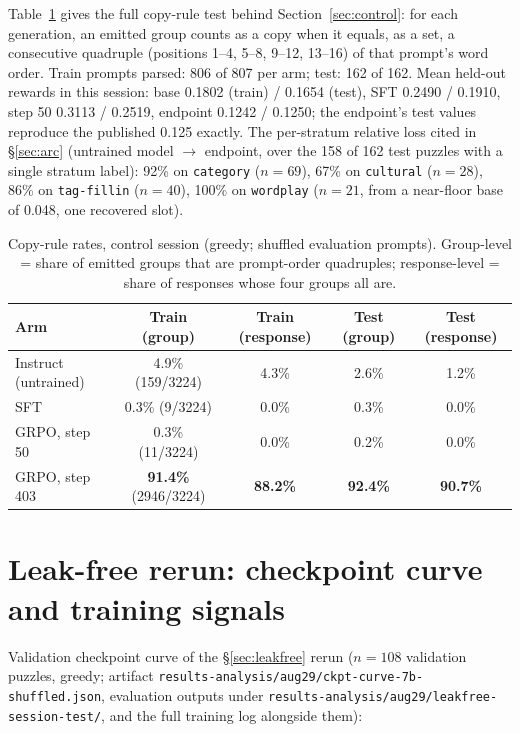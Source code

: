 \documentclass{article}
\begin{document}
Table~\ref{tab:copy} gives the full copy-rule test behind
Section~\ref{sec:control}: for each generation, an emitted group counts as
a copy when it equals, as a set, a consecutive quadruple (positions 1--4,
5--8, 9--12, 13--16) of that prompt's word order. Train prompts parsed:
806 of 807 per arm; test: 162 of 162. Mean held-out rewards in this
session: base 0.1802 (train) / 0.1654 (test), SFT 0.2490 / 0.1910, step 50
0.3113 / 0.2519, endpoint 0.1242 / 0.1250; the endpoint's test values
reproduce the published 0.125 exactly. The per-stratum relative loss cited
in \S\ref{sec:arc} (untrained model $\to$ endpoint, over the 158 of 162
test puzzles with a single stratum label): 92\% on \texttt{category}
($n=69$), 67\% on \texttt{cultural} ($n=28$), 86\% on \texttt{tag-fillin}
($n=40$), 100\% on \texttt{wordplay} ($n=21$, from a near-floor base of
0.048, one recovered slot).

\begin{table}[h]
\centering
\caption{Copy-rule rates, control session (greedy; shuffled evaluation
prompts). Group-level = share of emitted groups that are prompt-order
quadruples; response-level = share of responses whose four groups all are.}
\label{tab:copy}
\small
\setlength{\tabcolsep}{4pt}
\begin{tabular}{lcccc}
\toprule
Arm & Train (group) & Train (response) & Test (group) & Test (response) \\
\midrule
Instruct (untrained) & 4.9\% (159/3224) & 4.3\% & 2.6\% & 1.2\% \\
SFT & 0.3\% (9/3224) & 0.0\% & 0.3\% & 0.0\% \\
GRPO, step 50 & 0.3\% (11/3224) & 0.0\% & 0.2\% & 0.0\% \\
GRPO, step 403 & \textbf{91.4\%} (2946/3224) & \textbf{88.2\%} & \textbf{92.4\%} & \textbf{90.7\%} \\
\bottomrule
\end{tabular}
\end{table}

\section{Leak-free rerun: checkpoint curve and training signals}
\label{app:leakfree}

Validation checkpoint curve of the \S\ref{sec:leakfree} rerun ($n=108$
validation puzzles, greedy; artifact
\texttt{results-analysis/aug29/ckpt-curve-7b-shuffled.json}, evaluation
outputs under \texttt{results-analysis/aug29/leakfree-session-test/}, and
the full training log alongside them):
\end{document}
